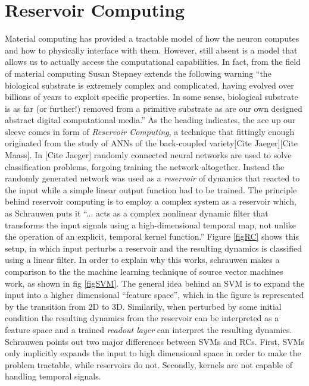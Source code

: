 \section{Reservoir Computing}
Material computing has provided a tractable model of how the neuron computes and
how to physically interface with them.
However, still absent is a model that allows us to actually access the
computational capabilities.
In fact, from the field of material computing Susan Stepney extends the
following warning ``the biological substrate is extremely complex and
complicated, having evolved over billions of years to exploit specific
properties. In some sense, biological substrate is as far (or further!) removed
from a primitive substrate as are our own designed abstract digital
computational media.''
%
As the heading indicates, the ace up our sleeve comes in form of \emph{Reservoir
  Computing}, a technique that fittingly enough originated from the study of
ANNs of the back-coupled variety[Cite Jaeger][Cite Maass].
In [Cite Jaeger] randomly connected neural networks are used to solve
classification problems, forgoing training the network altogether.
Instead the randomly generated network was used as a \emph{reservoir} of
dynamics that reacted to the input while a simple linear output function had to
be trained.
The principle behind reservoir computing is to employ a complex system as a
reservoir which, as Schrauwen puts it \cite{schrauwen_overview_2007} ``... acts
as a complex nonlinear dynamic filter that transforms the input signals using a
high-dimensional temporal map, not unlike the operation of an explicit, temporal
kernel function.''
Figure \ref{figRC} shows this setup, in which input perturbs a reservoir and the
resulting dynamics is classified using a linear filter.
%
In order to explain why this works, schrauwen makes a comparison to the the
machine learning technique of source vector machines work, as shown in fig
\ref{figSVM}.
The general idea behind an SVM is to expand the input into a higher dimensional
``feature space'', which in the figure is represented by the transition from 2D
to 3D.
Similarily, when perturbed by some initial condition the resulting dynamics from
the reservoir can be interpreted as a feature space and a trained \emph{readout
layer} can interpret the resulting dynamics.
Schrauwen points out two major differences between SVMs and RCs.
First, SVMs only implicitly expands the input to high dimensional space in order
to make the problem tractable, while reservoirs do not.
Secondly, kernels are not capable of handling temporal signals.
